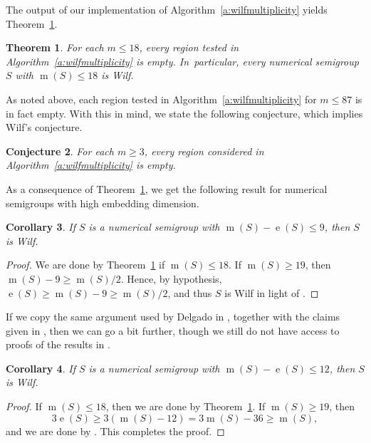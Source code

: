 \documentclass[12pt]{amsart}
\newtheorem{thm}{Theorem}[section]
\newtheorem{cor}[thm]{Corollary}
\newtheorem{conj}[thm]{Conjecture}
\theoremstyle{definition}
\numberwithin{equation}{section}
\renewcommand\>{\rangle}
\newcommand\<{\langle}
\newcommand\0{\mathbf{0}}
\begin{document}
The output of our implementation of Algorithm~\ref{a:wilfmultiplicity} yields Theorem~\ref{t:m18}.  

\begin{thm}\label{t:m18}
For each $m \le 18$, every region tested in Algorithm~\ref{a:wilfmultiplicity} is empty.  In~particular, every numerical semigroup $S$ with $\operatorname m(S) \le 18$ is Wilf.  
\end{thm}

As noted above, each region tested in Algorithm~\ref{a:wilfmultiplicity} for $m \le 87$ is in fact empty.  With this in mind, we state the following conjecture, which implies Wilf's conjecture.  

\begin{conj}\label{conj:emptyregions}
For each $m \ge 3$, every region considered in Algorithm~\ref{a:wilfmultiplicity} is empty.  
\end{conj}

As a consequence of Theorem~\ref{t:m18}, we get the following result for numerical semigroups with high embedding dimension. 

\begin{cor}\label{c:delgado}
If $S$ is a numerical semigroup with $\operatorname m(S) - \operatorname e(S) \le 9$, then $S$ is Wilf.
\end{cor}
\begin{proof}
We are done by Theorem~\ref{t:m18} if $\operatorname m(S) \le 18$.  If $\operatorname m(S) \ge 19$, then $\operatorname{m}(S)-9\ge \operatorname{m}(S)/2$. Hence, by hypothesis, $\operatorname{e}(S)\ge\operatorname{m}(S)-9\ge \operatorname{m}(S)/2$, and thus $S$ is Wilf in light of \cite{samm}.
\end{proof}

If we copy the same argument used by Delgado in \cite[Remark 3.20]{wilf-survey}, together with the claims given in \cite{eliahou-imns}, then we can go a bit further, though we still do not have access to proofs of the results in \cite{eliahou-imns}.

\begin{cor}\label{c:delgado-2}
	If $S$ is a numerical semigroup with $\operatorname m(S) - \operatorname e(S) \le 12$, then $S$ is Wilf.
\end{cor}
\begin{proof}
If $\operatorname m(S) \le 18$, then we are done by Theorem~\ref{t:m18}.  If $\operatorname m(S) \ge 19$, then
\[
3\operatorname e(S) \ge 3(\operatorname m(S) - 12) = 3\operatorname m(S) - 36 \ge \operatorname m(S),
\]
and we are done by \cite{eliahou-imns}.  This completes the proof.  
\end{proof}
\end{document}
